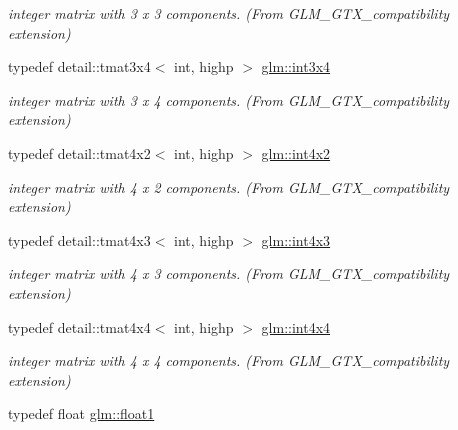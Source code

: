 \begin{DoxyCompactItemize}
\begin{DoxyCompactList}\small\item\em integer matrix with 3 x 3 components. (From G\+L\+M\+\_\+\+G\+T\+X\+\_\+compatibility extension) \end{DoxyCompactList}\item 
typedef detail\+::tmat3x4$<$ int, highp $>$ \hyperlink{group__gtx__compatibility_ga7cb1c0960d6551c34c666ad5829e9c65}{glm\+::int3x4}\hypertarget{group__gtx__compatibility_ga7cb1c0960d6551c34c666ad5829e9c65}{}\label{group__gtx__compatibility_ga7cb1c0960d6551c34c666ad5829e9c65}

\begin{DoxyCompactList}\small\item\em integer matrix with 3 x 4 components. (From G\+L\+M\+\_\+\+G\+T\+X\+\_\+compatibility extension) \end{DoxyCompactList}\item 
typedef detail\+::tmat4x2$<$ int, highp $>$ \hyperlink{group__gtx__compatibility_gac391157aca117c5d52b10c2c3ca5c9be}{glm\+::int4x2}\hypertarget{group__gtx__compatibility_gac391157aca117c5d52b10c2c3ca5c9be}{}\label{group__gtx__compatibility_gac391157aca117c5d52b10c2c3ca5c9be}

\begin{DoxyCompactList}\small\item\em integer matrix with 4 x 2 components. (From G\+L\+M\+\_\+\+G\+T\+X\+\_\+compatibility extension) \end{DoxyCompactList}\item 
typedef detail\+::tmat4x3$<$ int, highp $>$ \hyperlink{group__gtx__compatibility_gaa80ec1b785920a08d366b3c09859d888}{glm\+::int4x3}\hypertarget{group__gtx__compatibility_gaa80ec1b785920a08d366b3c09859d888}{}\label{group__gtx__compatibility_gaa80ec1b785920a08d366b3c09859d888}

\begin{DoxyCompactList}\small\item\em integer matrix with 4 x 3 components. (From G\+L\+M\+\_\+\+G\+T\+X\+\_\+compatibility extension) \end{DoxyCompactList}\item 
typedef detail\+::tmat4x4$<$ int, highp $>$ \hyperlink{group__gtx__compatibility_ga5f8072c2dce67ad49939e12b168d1de1}{glm\+::int4x4}\hypertarget{group__gtx__compatibility_ga5f8072c2dce67ad49939e12b168d1de1}{}\label{group__gtx__compatibility_ga5f8072c2dce67ad49939e12b168d1de1}

\begin{DoxyCompactList}\small\item\em integer matrix with 4 x 4 components. (From G\+L\+M\+\_\+\+G\+T\+X\+\_\+compatibility extension) \end{DoxyCompactList}\item 
typedef float \hyperlink{group__gtx__compatibility_gae0ad1b0450320cda98bbbecb56bc3167}{glm\+::float1}\hypertarget{group__gtx__compatibility_gae0ad1b0450320cda98bbbecb56bc3167}{}\label{group__gtx__compatibility_gae0ad1b0450320cda98bbbecb56bc3167}


\end{DoxyCompactItemize}
